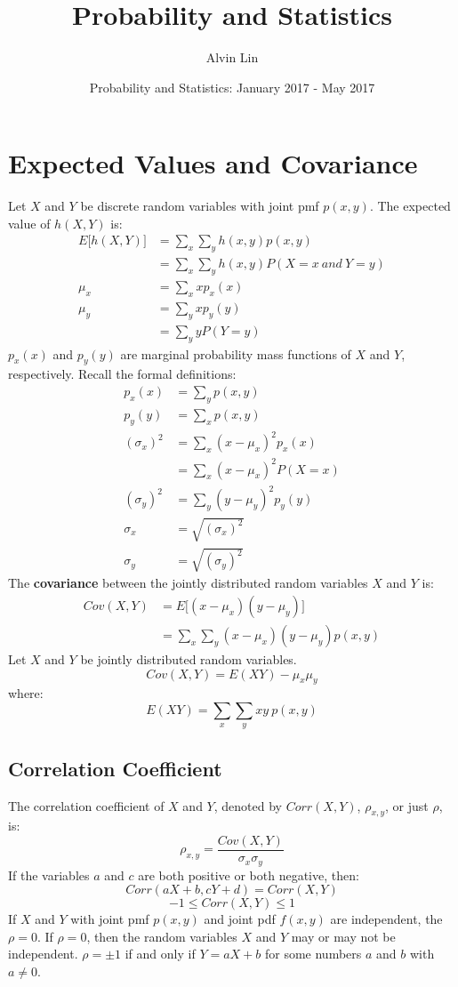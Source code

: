 \documentclass{math}
\title{Probability and Statistics}
\author{Alvin Lin}
\date{Probability and Statistics: January 2017 - May 2017}
\begin{document}
\maketitle

\section*{Expected Values and Covariance}
Let \( X \) and \( Y \) be discrete random variables with joint pmf
\( p(x,y) \). The expected value of \( h(X,Y) \) is:
\begin{align*}
  E\bigg[h(X,Y)\bigg] &= \sum_{x}\sum_{y}h(x,y)p(x,y) \\
  &= \sum_{x}\sum_{y}h(x,y)P(X=x\ and\ Y=y) \\
  \mu_{x} &= \sum_{x}xp_{x}(x) \\
  \mu_{y} &= \sum_{y}xp_{y}(y) \\
  &= \sum_{y}yP(Y=y)
\end{align*}
\( p_{x}(x) \) and \( p_{y}(y) \) are marginal probability mass functions of
\( X \) and \( Y \), respectively. Recall the formal definitions:
\begin{align*}
  p_{x}(x) &= \sum_{y}p(x,y) \\
  p_{y}(y) &= \sum_{x}p(x,y) \\
  (\sigma_{x})^{2} &= \sum_{x}(x-\mu_{x})^{2}p_{x}(x) \\
  &= \sum_{x}(x-\mu_{x})^{2}P(X=x) \\
  (\sigma_{y})^{2} &= \sum_{y}(y-\mu_{y})^{2}p_{y}(y) \\
  \sigma_{x} &= \sqrt{(\sigma_{x})^{2}} \\
  \sigma_{y} &= \sqrt{(\sigma_{y})^{2}}
\end{align*}
The \textbf{covariance} between the jointly distributed random variables
\( X \) and \( Y \) is:
\begin{align*}
  Cov(X,Y) &= E\bigg[(x-\mu_{x})(y-\mu_{y})\bigg] \\
  &= \sum_{x}\sum_{y}(x-\mu_{x})(y-\mu_{y})p(x,y)
\end{align*}
Let \( X \) and \( Y \) be jointly distributed random variables.
\[ Cov(X,Y) = E(XY)-\mu_{x}\mu_{y} \]
where:
\[ E(XY) = \sum_{x}\sum_{y}xy\ p(x,y) \]

\subsection*{Correlation Coefficient}
The correlation coefficient of \( X \) and \( Y \), denoted by \( Corr(X,Y) \),
\( \rho_{x,y} \), or just \( \rho \), is:
\[ \rho_{x,y} = \frac{Cov(X,Y)}{\sigma_{x}\sigma_{y}} \]
If the variables \( a \) and \( c \) are both positive or both negative, then:
\[ Corr(aX+b,cY+d) = Corr(X,Y) \]
\[ -1\leq Corr(X,Y) \leq 1 \]
If \( X \) and \( Y \) with joint pmf \( p(x,y) \) and joint pdf \( f(x,y) \)
are independent, the \( \rho = 0 \). If \( \rho = 0 \), then the random
variables \( X \) and \( Y \) may or may not be independent. \( \rho = \pm1 \)
if and only if \( Y = aX+b \) for some numbers \( a \) and \( b \) with
\( a \neq 0 \).
\end{document}
